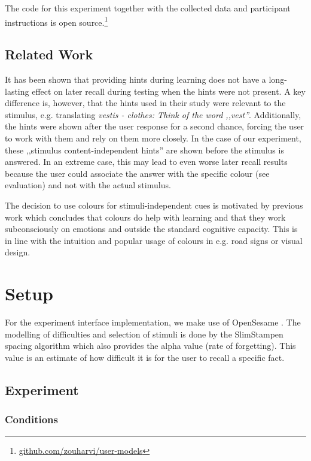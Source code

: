 The code for this experiment together with the collected data and participant instructions is open source.\footnote{\href{https://github.com/zouharvi/user-models/}{github.com/zouharvi/user-models}}

\subsection{Related Work}

It has been shown \cite{van2019effects} that providing hints during learning does not have a long-lasting effect on later recall during testing when the hints were not present.
A key difference is, however, that the hints used in their study were relevant to the stimulus, e.g. translating \emph{vestis - clothes: Think of the word ,,vest''}.
Additionally, the hints were shown after the user response for a second chance, forcing the user to work with them and rely on them more closely.
In the case of our experiment, these ,,stimulus content-independent hints'' are shown before the stimulus is answered.
In an extreme case, this may lead to even worse later recall results because the user could associate the answer with the specific colour (see evaluation) and not with the actual stimulus.

The decision to use colours for stimuli-independent cues is motivated by previous work \cite{chang2018impact} which concludes that colours do help with learning and that they work subconsciously on emotions and outside the standard cognitive capacity.
This is in line with the intuition and popular usage of colours in e.g. road signs or visual design.

\section{Setup}

For the experiment interface implementation, we make use of OpenSesame \cite{mathot2012opensesame}.
The modelling of difficulties and selection of stimuli is done by the SlimStampen \cite{sense2016individual} spacing algorithm which also provides the alpha value (rate of forgetting).
This value is an estimate of how difficult it is for the user to recall a specific fact.

\subsection{Experiment}

\subsubsection{Conditions}

